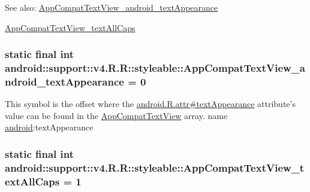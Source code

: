 \begin{Desc}
\item[See also:]\hyperlink{classandroid_1_1support_1_1v4_1_1_r_1_1styleable_2d9b7b115f3b8c8fd3fd2393e77a2fc0}{AppCompatTextView\_\-android\_\-textAppearance} 

\hyperlink{classandroid_1_1support_1_1v4_1_1_r_1_1styleable_e0710b843567b5d6b3777bcbd6456ac4}{AppCompatTextView\_\-textAllCaps} \end{Desc}
\hypertarget{classandroid_1_1support_1_1v4_1_1_r_1_1styleable_2d9b7b115f3b8c8fd3fd2393e77a2fc0}{
\subsubsection[{AppCompatTextView\_\-android\_\-textAppearance}]{\setlength{\rightskip}{0pt plus 5cm}static final int android::support::v4.R.R::styleable::AppCompatTextView\_\-android\_\-textAppearance = 0}}
\label{classandroid_1_1support_1_1v4_1_1_r_1_1styleable_2d9b7b115f3b8c8fd3fd2393e77a2fc0}


This symbol is the offset where the \hyperlink{}{android.R.attr\#textAppearance} attribute's value can be found in the \hyperlink{classandroid_1_1support_1_1v4_1_1_r_1_1styleable_2000bab6df68054d5e2a8e1f43e47fc8}{AppCompatTextView} array.  name \hyperlink{namespaceandroid}{android}:textAppearance \hypertarget{classandroid_1_1support_1_1v4_1_1_r_1_1styleable_e0710b843567b5d6b3777bcbd6456ac4}{
\subsubsection[{AppCompatTextView\_\-textAllCaps}]{\setlength{\rightskip}{0pt plus 5cm}static final int android::support::v4.R.R::styleable::AppCompatTextView\_\-textAllCaps = 1}}
\label{classandroid_1_1support_1_1v4_1_1_r_1_1styleable_e0710b843567b5d6b3777bcbd6456ac4}



